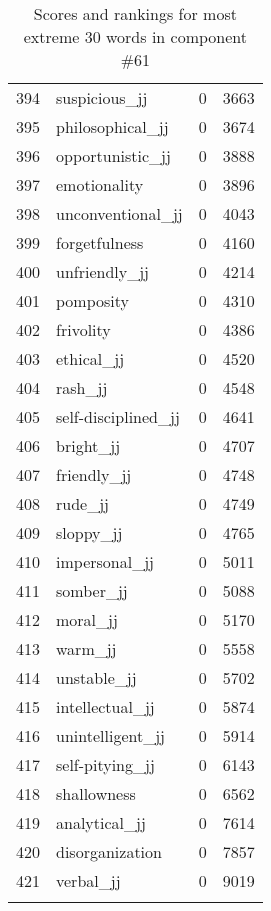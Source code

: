 \begin{longtable}[!htbp]{| rlr@{.}l |}
    394 & suspicious\_jj & 0 & 3663 \\
    395 & philosophical\_jj & 0 & 3674 \\
    396 & opportunistic\_jj & 0 & 3888 \\
    397 & emotionality & 0 & 3896 \\
    398 & unconventional\_jj & 0 & 4043 \\
    399 & forgetfulness & 0 & 4160 \\
    400 & unfriendly\_jj & 0 & 4214 \\
    401 & pomposity & 0 & 4310 \\
    402 & frivolity & 0 & 4386 \\
    403 & ethical\_jj & 0 & 4520 \\
    404 & rash\_jj & 0 & 4548 \\
    405 & self-disciplined\_jj & 0 & 4641 \\
    406 & bright\_jj & 0 & 4707 \\
    407 & friendly\_jj & 0 & 4748 \\
    408 & rude\_jj & 0 & 4749 \\
    409 & sloppy\_jj & 0 & 4765 \\
    410 & impersonal\_jj & 0 & 5011 \\
    411 & somber\_jj & 0 & 5088 \\
    412 & moral\_jj & 0 & 5170 \\
    413 & warm\_jj & 0 & 5558 \\
    414 & unstable\_jj & 0 & 5702 \\
    415 & intellectual\_jj & 0 & 5874 \\
    416 & unintelligent\_jj & 0 & 5914 \\
    417 & self-pitying\_jj & 0 & 6143 \\
    418 & shallowness & 0 & 6562 \\
    419 & analytical\_jj & 0 & 7614 \\
    420 & disorganization & 0 & 7857 \\
    421 & verbal\_jj & 0 & 9019 \\
    \hline
    \caption{Scores and rankings for most extreme 30 words in component \#61} \\
\end{longtable}
